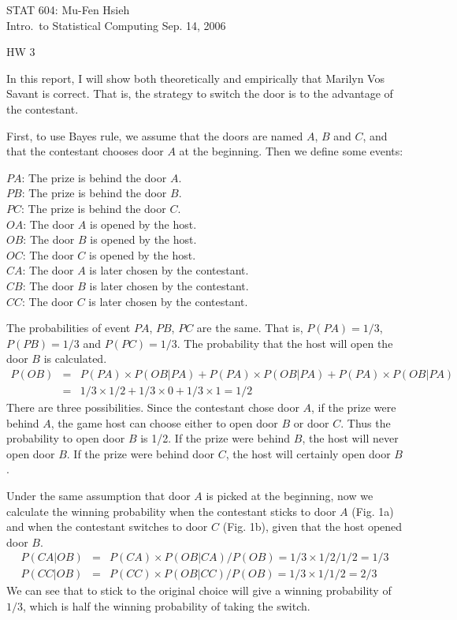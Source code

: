 \documentclass[12pt]{article}
\begin{document}
STAT 604: \hfill {Mu-Fen Hsieh}\\
Intro.\ to Statistical Computing \hfill {Sep. 14, 2006}

\begin{center}
\Large HW 3\\
\end{center}

In this report, I will show both theoretically and empirically that Marilyn Vos Savant is correct. That is, the strategy to switch
 the door is to the advantage of the contestant.
 
First, to use Bayes rule, we assume that the doors are named $A$, $B$ and $C$, and that the contestant chooses door $A$ at the beginning. 
Then we define some events:\\
\begin{center}
$PA$: The prize is behind the door $A$.\\
$PB$: The prize is behind the door $B$.\\
$PC$: The prize is behind the door $C$.\\
$OA$: The door $A$ is opened by the host.\\
$OB$: The door $B$ is opened by the host.\\
$OC$: The door $C$ is opened by the host.\\
$CA$: The door $A$ is later chosen by the contestant.\\
$CB$: The door $B$ is later chosen by the contestant.\\
$CC$: The door $C$ is later chosen by the contestant.
\end{center}

The probabilities of event $PA$, $PB$, $PC$ are the same. That is, $P(PA)=1/3$, $P(PB)=1/3$ and $P(PC)=1/3$. The probability that the host will 
open the door $B$ is calculated.
\begin{eqnarray}P(OB) & = & P(PA) \times P(OB|PA) + P(PA) \times P(OB|PA) + P(PA) \times P(OB|PA) \nonumber \\
& = & 1/3 \times 1/2 + 1/3 \times 0 + 1/3 \times 1 = 1/2\end{eqnarray}
There are three possibilities. Since the contestant chose door $A$, if the prize were behind $A$, the game host can choose either to open 
door $B$ or door $C$. Thus the probability to open door $B$ is 1/2. If the prize were behind $B$, the host will never open door $B$. If the 
prize were behind door $C$, the host will certainly open door $B$.

Under the same assumption that door $A$ is picked at the beginning, now we calculate the winning probability when the contestant sticks 
to door $A$ (Fig. 1a) and when the contestant switches to door $C$ (Fig. 1b), given that the host opened door $B$. 
\begin{eqnarray}P(CA|OB) & = & P(CA) \times P(OB|CA) / P(OB) = 1/3 \times 1/2 / 1/2 = 1/3\\
                P(CC|OB) & = & P(CC) \times P(OB|CC) / P(OB) = 1/3 \times 1 / 1/2 = 2/3\end{eqnarray}
We can see that to stick to the original choice will give a winning probability of $1/3$, which is half the winning probability of taking the switch.
\end{document}
